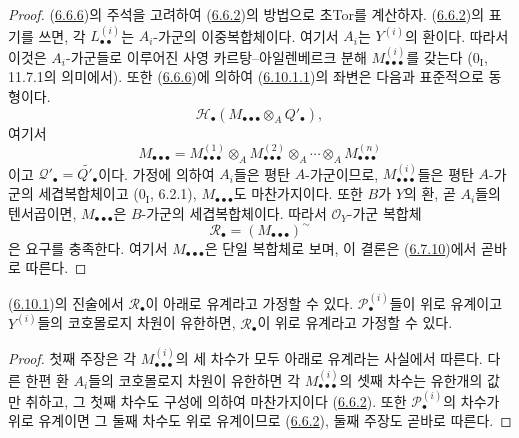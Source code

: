 \begin{proof}
(\hyperref[III.6.6.6-fr]{6.6.6})의 주석을 고려하여
(\hyperref[III.6.6.2-fr]{6.6.2})의 방법으로 초Tor를 계산하자.
(\hyperref[III.6.6.2-fr]{6.6.2})의 표기를 쓰면, 각
$L_{\bullet\bullet}^{(i)}$는 $A_i$-가군의 이중복합체이다. 여기서
$A_i$는 $Y^{(i)}$의 환이다. 따라서 이것은 $A_i$-가군들로 이루어진
사영 카르탕--아일렌베르크 분해
$M_{\bullet\bullet\bullet}^{(i)}$를 갖는다
($0_{\mathrm I}$, 11.7.1의 의미에서). 또한
(\hyperref[III.6.6.6-fr]{6.6.6})에 의하여
(\hyperref[III.6.10.1.1.fr]{6.10.1.1})의 좌변은 다음과
표준적으로 동형이다.
\[
  \mathscr H_\bullet
  (M_{\bullet\bullet\bullet}\otimes_A Q'_\bullet),
\]
여기서
\[
  M_{\bullet\bullet\bullet}
  =
  M_{\bullet\bullet\bullet}^{(1)}
  \otimes_A M_{\bullet\bullet\bullet}^{(2)}
  \otimes_A\cdots\otimes_A M_{\bullet\bullet\bullet}^{(n)}
\]
이고 $\mathscr Q'_\bullet=\widetilde{Q'_\bullet}$이다. 가정에 의하여
$A_i$들은 평탄 $A$-가군이므로,
$M_{\bullet\bullet\bullet}^{(i)}$들은 평탄 $A$-가군의
세겹복합체이고 ($0_{\mathrm I}$, 6.2.1),
$M_{\bullet\bullet\bullet}$도 마찬가지이다. 또한 $B$가 $Y$의
환, 곧 $A_i$들의 텐서곱이면, $M_{\bullet\bullet\bullet}$은
$B$-가군의 세겹복합체이다. 따라서 $\mathscr O_Y$-가군 복합체
\[
  \mathscr R_\bullet=(M_{\bullet\bullet\bullet})^\sim
\]
은 요구를 충족한다. 여기서 $M_{\bullet\bullet\bullet}$은 단일
복합체로 보며, 이 결론은
(\hyperref[III.6.7.10-fr]{6.7.10})에서 곧바로 따른다.
\end{proof}

\begin{corollary}[6.10.2]
\label{III.6.10.2-fr}
(\hyperref[III.6.10.1-fr]{6.10.1})의 진술에서
$\mathscr R_\bullet$이 아래로 유계라고 가정할 수 있다.
$\mathscr P_\bullet^{(i)}$들이 위로 유계이고 $Y^{(i)}$들의
코호몰로지 차원이 유한하면, $\mathscr R_\bullet$이 위로
유계라고 가정할 수 있다.
\end{corollary}

\begin{proof}
첫째 주장은 각 $M_{\bullet\bullet\bullet}^{(i)}$의 세 차수가 모두
아래로 유계라는 사실에서 따른다. 다른 한편 환 $A_i$들의
코호몰로지 차원이 유한하면 각 $M_{\bullet\bullet\bullet}^{(i)}$의
셋째 차수는 유한개의 값만 취하고, 그 첫째 차수도 구성에 의하여
마찬가지이다 (\hyperref[III.6.6.2-fr]{6.6.2}). 또한
$\mathscr P_\bullet^{(i)}$의 차수가 위로 유계이면 그 둘째 차수도
위로 유계이므로 (\hyperref[III.6.6.2-fr]{6.6.2}), 둘째 주장도
곧바로 따른다.
\end{proof}

